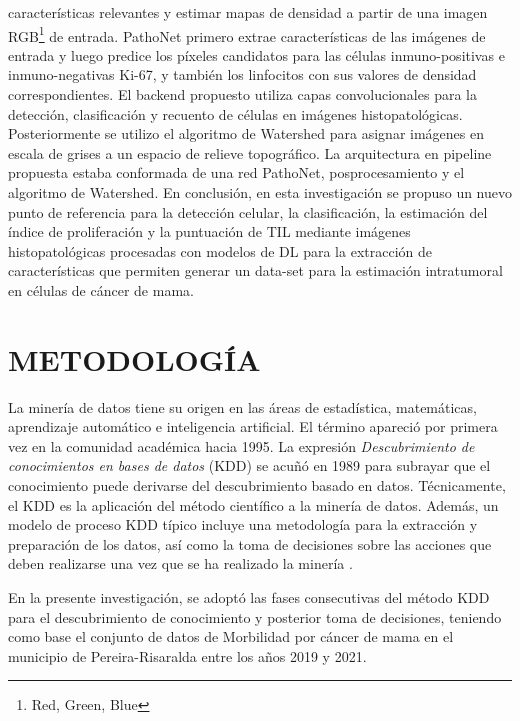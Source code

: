 características relevantes y estimar mapas de densidad a partir de una imagen RGB\footnote{Red, Green, Blue} de entrada. PathoNet primero extrae características de las imágenes de entrada y luego predice los píxeles candidatos para las células inmuno-positivas e inmuno-negativas Ki-67, y también los linfocitos con sus valores de densidad correspondientes. El backend propuesto utiliza capas convolucionales para la detección, clasificación y recuento de células en imágenes histopatológicas. Posteriormente se utilizo el algoritmo de Watershed para asignar imágenes en escala de grises a un espacio de relieve topográfico. La arquitectura en pipeline propuesta estaba conformada de una red PathoNet, posprocesamiento y el algoritmo de Watershed. En conclusión, en esta investigación se propuso un nuevo punto de referencia para la detección celular, la clasificación, la estimación del índice de proliferación y la puntuación de TIL mediante imágenes histopatológicas procesadas con modelos de DL para la extracción de características que permiten generar un data-set para la estimación intratumoral en células de cáncer de mama.


\section{METODOLOGÍA}

{\tiny }La minería de datos tiene su origen en las áreas de estadística, matemáticas, aprendizaje automático e inteligencia artificial. El término apareció por primera vez en la comunidad académica hacia 1995. La expresión \textit{Descubrimiento de conocimientos en bases de datos} (KDD) se acuñó en 1989 para subrayar que el conocimiento puede derivarse del descubrimiento basado en datos. Técnicamente, el KDD es la aplicación del método científico a la minería de datos. Además, un modelo de proceso KDD típico incluye una metodología para la extracción y preparación de los datos, así como la toma de decisiones sobre las acciones que deben realizarse una vez que se ha realizado la minería \cite{Roiger2017}.  

En la presente investigación, se adoptó las fases consecutivas del método KDD \cite{Shafique2014} para el descubrimiento de conocimiento y posterior toma de decisiones, teniendo como base el conjunto de datos de Morbilidad por cáncer de mama en el municipio de Pereira-Risaralda entre los años 2019 y 2021.








